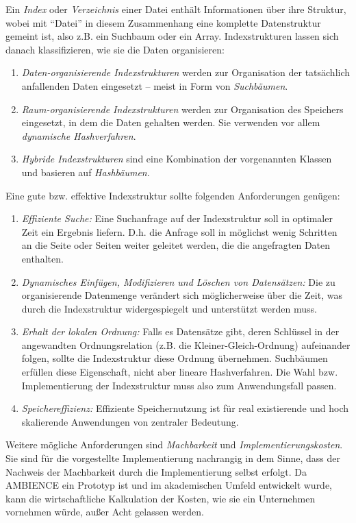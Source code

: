 Ein \textit{Index} oder \textit{Verzeichnis} einer Datei enthält Informationen über ihre Struktur, wobei mit "`Datei"' in diesem Zusammenhang eine komplette Datenstruktur gemeint ist, also z.B. ein Suchbaum oder ein Array. Indexstrukturen lassen sich danach klassifizieren, wie sie die Daten organisieren: 
\enlargethispage{\baselineskip}
\begin{enumerate}
	\item \textit{Daten-organisierende Indexstrukturen} werden zur Organisation der tatsächlich anfallenden Daten eingesetzt -- meist in Form von \textit{Suchbäumen}. 
	\item \textit{Raum-organisierende Indexstrukturen} werden zur Organisation des Speichers eingesetzt, in dem die Daten gehalten werden. Sie verwenden vor allem \textit{dynamische Hashverfahren}. 
	\item \textit{Hybride Indexstrukturen} sind eine Kombination der vorgenannten Klassen und basieren auf \textit{Hashbäumen}.   
\end{enumerate}
Eine gute bzw. effektive Indexstruktur sollte folgenden Anforderungen genügen: 
\begin{enumerate}
	\item \textit{Effiziente Suche:} Eine Suchanfrage auf der Indexstruktur soll in optimaler Zeit ein Ergebnis liefern. D.h. die Anfrage soll in möglichst wenig Schritten an die Seite oder Seiten weiter geleitet werden, die die angefragten Daten enthalten.
	\item \textit{Dynamisches Einfügen, Modifizieren und Löschen von Datensätzen:} Die zu organisierende Datenmenge verändert sich möglicherweise über die Zeit, was durch die Indexstruktur widergespiegelt und unterstützt werden muss.  
	\item \textit{Erhalt der lokalen Ordnung:} Falls es Datensätze gibt, deren Schlüssel in der angewandten Ordnungsrelation (z.B. die Kleiner-Gleich-Ordnung) aufeinander folgen, sollte die Indexstruktur diese Ordnung übernehmen. Suchbäumen erfüllen diese Eigenschaft, nicht aber lineare Hashverfahren. Die Wahl bzw. Implementierung der Indexstruktur muss also zum Anwendungsfall passen. 
	\item \textit{Speichereffizienz:} Effiziente Speichernutzung ist für real existierende und hoch skalierende Anwendungen von zentraler Bedeutung. 
\end{enumerate}
Weitere mögliche Anforderungen sind \textit{Machbarkeit} und \textit{Implementierungskosten}. Sie sind für die vorgestellte Implementierung nachrangig in dem Sinne, dass der Nachweis der Machbarkeit durch die Implementierung selbst erfolgt. Da AMBIENCE ein Prototyp ist und im akademischen Umfeld entwickelt wurde, kann die wirtschaftliche Kalkulation der Kosten, wie sie ein Unternehmen vornehmen würde, außer Acht gelassen werden. 

